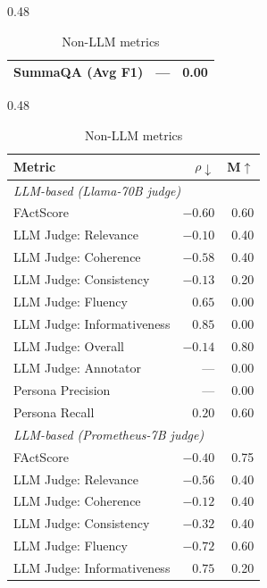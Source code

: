 \begin{table}[htbp]
\begin{subtable}[t]{0.48\textwidth}
\begin{tabular}{lrr}
\rowcolor{matchFalse} SummaQA (Avg F1)                      &      --- &  0.00 \\
\bottomrule
\end{tabular}
\caption{Non-LLM metrics}
\end{subtable}
\hfill
\begin{subtable}[t]{0.48\textwidth}
\centering
\begin{tabular}{lrr}
\toprule
Metric & $\rho\downarrow$ & M$\uparrow$ \\
\midrule
\multicolumn{3}{l}{\textit{LLM-based (Llama-70B judge)}} \\
\midrule
\rowcolor{matchTrue} FActScore                             &  $-0.60$ &  0.60 \\
\rowcolor{matchFalse} LLM Judge: Relevance                  &  $-0.10$ &  0.40 \\
\rowcolor{matchTrue} LLM Judge: Coherence                  &  $-0.58$ &  0.40 \\
\rowcolor{matchFalse} LLM Judge: Consistency                &  $-0.13$ &  0.20 \\
\rowcolor{matchFalse} LLM Judge: Fluency                    &   $0.65$ &  0.00 \\
\rowcolor{matchFalse} LLM Judge: Informativeness            &   $0.85$ &  0.00 \\
\rowcolor{matchFalse} LLM Judge: Overall                    &  $-0.14$ &  0.80 \\
\rowcolor{matchFalse} LLM Judge: Annotator        &      --- &  0.00 \\
\rowcolor{matchFalse} Persona Precision                     &      --- &  0.00 \\
\rowcolor{matchFalse} Persona Recall                        &   $0.20$ &  0.60 \\
\midrule
\multicolumn{3}{l}{\textit{LLM-based (Prometheus-7B judge)}} \\
\midrule
\rowcolor{matchTrue} FActScore                             &  $-0.40$ &  0.75 \\
\rowcolor{matchTrue} LLM Judge: Relevance                  &  $-0.56$ &  0.40 \\
\rowcolor{matchFalse} LLM Judge: Coherence                  &  $-0.12$ &  0.40 \\
\rowcolor{matchFalse} LLM Judge: Consistency                &  $-0.32$ &  0.40 \\
\rowcolor{matchTrue} LLM Judge: Fluency                    &  $-0.72$ &  0.60 \\
\rowcolor{matchFalse} LLM Judge: Informativeness            &   $0.75$ &  0.20 \\

\end{tabular}
\end{subtable}
\end{table}
